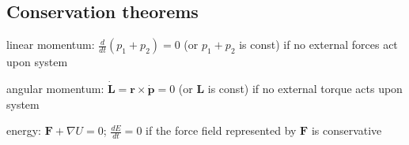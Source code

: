 \documentclass[letterpaper,landscape,10pt]{article}
\newenvironment{mydescription}
{\begin{description}
	\setlength{\itemsep}{0pt}
	\setlength{\parskip}{0pt}
	\setlength{\parsep}{-1pt}}
{\end{description}}
\begin{document}
{\begin{multicols}{3}
	\subsection*{Conservation theorems}
		\begin{mydescription}
			\item[linear momentum:]
				$\frac{d}{dt}\left(p_1 + p_2\right) = 0$ (or $p_1+p_2$ is const)
				if no external forces act upon system  \\
			\item[angular momentum:]
				$\dot{\bm{L}}=\bm{r}\times\dot{\bm{p}}=0$ (or $\bm{L}$ is
				const) if no external torque acts upon system \\
			\item[energy:]
				$\bm{F}+\nabla U = 0$; $\frac{dE}{dt} = 0$ if the force field
				represented by $\bm{F}$ is conservative
		\end{mydescription}
	

\end{multicols}}
\end{document}
